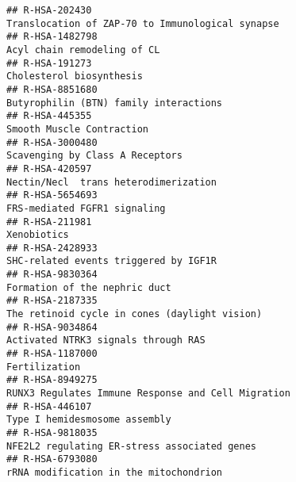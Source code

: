 \documentclass[
]{article}
\begin{document}
\begin{verbatim}
## R-HSA-202430                                                                                      Translocation of ZAP-70 to Immunological synapse
## R-HSA-1482798                                                                                                          Acyl chain remodeling of CL
## R-HSA-191273                                                                                                              Cholesterol biosynthesis
## R-HSA-8851680                                                                                               Butyrophilin (BTN) family interactions
## R-HSA-445355                                                                                                             Smooth Muscle Contraction
## R-HSA-3000480                                                                                                      Scavenging by Class A Receptors
## R-HSA-420597                                                                                                 Nectin/Necl  trans heterodimerization
## R-HSA-5654693                                                                                                         FRS-mediated FGFR1 signaling
## R-HSA-211981                                                                                                                           Xenobiotics
## R-HSA-2428933                                                                                                SHC-related events triggered by IGF1R
## R-HSA-9830364                                                                                                        Formation of the nephric duct
## R-HSA-2187335                                                                                        The retinoid cycle in cones (daylight vision)
## R-HSA-9034864                                                                                                  Activated NTRK3 signals through RAS
## R-HSA-1187000                                                                                                                        Fertilization
## R-HSA-8949275                                                                                   RUNX3 Regulates Immune Response and Cell Migration
## R-HSA-446107                                                                                                         Type I hemidesmosome assembly
## R-HSA-9818035                                                                                         NFE2L2 regulating ER-stress associated genes
## R-HSA-6793080                                                                                               rRNA modification in the mitochondrion

\end{verbatim}
\end{document}

